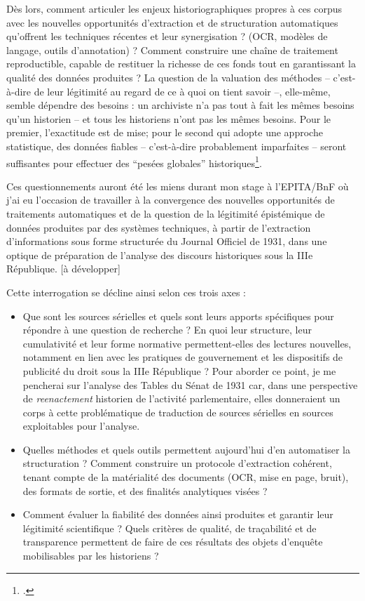 Dès lors, comment articuler les enjeux historiographiques propres à ces corpus avec les nouvelles opportunités d’extraction et de structuration automatiques qu’offrent les techniques récentes et leur synergisation ? (OCR, modèles de langage, outils d’annotation) ? Comment construire une chaîne de traitement reproductible, capable de restituer la richesse de ces fonds tout en garantissant la qualité des données produites ? La question de la valuation des méthodes -- c'est-à-dire de leur légitimité au regard de ce à quoi on tient savoir --, elle-même, semble dépendre des besoins : un archiviste n'a pas tout à fait les mêmes besoins qu'un historien -- et tous les historiens n'ont pas les mêmes besoins. Pour le premier, l'exactitude est de mise; pour le second qui adopte une approche statistique, des données fiables -- c'est-à-dire probablement imparfaites -- seront suffisantes pour effectuer des \enquote{pesées globales} historiques\footcite{muller}.


Ces questionnements auront été les miens durant mon stage à l'EPITA/BnF où j'ai eu l'occasion de travailler à la convergence des nouvelles opportunités de traitements automatiques et de la question de la légitimité épistémique de données produites par des systèmes techniques, à partir de l'extraction d'informations sous forme structurée du Journal Officiel de 1931, dans une optique de préparation de l'analyse des discours historiques sous la IIIe République. [à développer] 

Cette interrogation se décline ainsi selon ces trois axes :

\begin{itemize}
	\item Que sont les sources sérielles et quels sont leurs apports spécifiques pour répondre à une question de recherche ? En quoi leur structure, leur cumulativité et leur forme normative permettent-elles des lectures nouvelles, notamment en lien avec les pratiques de gouvernement et les dispositifs de publicité du droit sous la IIIe République ? Pour aborder ce point, je me pencherai sur l'analyse des Tables du Sénat de 1931 car, dans une perspective de \textit{reenactement} historien de l'activité parlementaire, elles donneraient un corps à cette problématique de traduction de sources sérielles en sources exploitables pour l'analyse.
	\item Quelles méthodes et quels outils permettent aujourd’hui d’en automatiser la structuration ? Comment construire un protocole d’extraction cohérent, tenant compte de la matérialité des documents (OCR, mise en page, bruit), des formats de sortie, et des finalités analytiques visées ?
	\item Comment évaluer la fiabilité des données ainsi produites et garantir leur légitimité scientifique ? Quels critères de qualité, de traçabilité et de transparence permettent de faire de ces résultats des objets d’enquête mobilisables par les historiens ?
\end{itemize}

